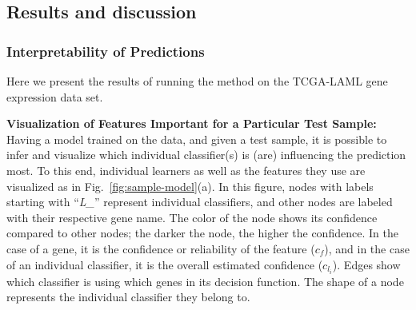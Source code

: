 \subsection{Results and discussion}
\subsubsection{Interpretability of Predictions}
Here we present the results of running the method on the TCGA-LAML gene expression data set.

\textbf{Visualization of  Features Important for a Particular Test Sample:}
Having a model trained on the data, and given a test sample, it is possible to infer and visualize which individual classifier(s) is (are) influencing the prediction most. To this end, individual learners as well as the features they use are visualized as in Fig.~\ref{fig:sample-model}(a). 
In this figure, nodes with labels starting with ``\emph{L\_}'' represent individual classifiers, and other nodes are labeled with their respective gene name. The color of the node shows its confidence compared to other nodes; the darker the node, the higher the confidence. In the case of a gene, it is the confidence or reliability of the feature ($c_f$), and in the case of an individual classifier, it is the overall estimated confidence ($c_{l_i}$). Edges show which classifier is using which genes in its decision function. The shape of a node represents the individual classifier they belong to.


